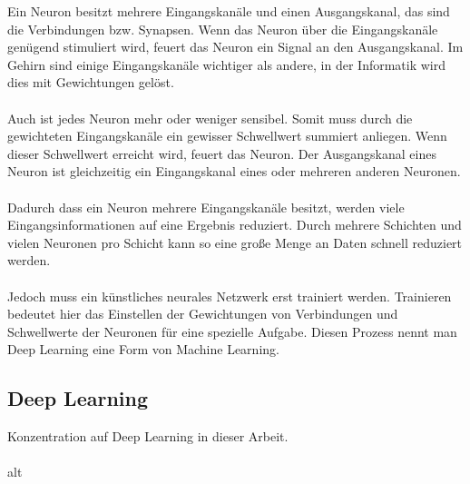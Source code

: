 \documentclass[12pt,oneside,a4paper,parskip]{scrbook}
\begin{document}
Ein Neuron besitzt mehrere Eingangskanäle 
und einen Ausgangskanal, das sind die Verbindungen bzw. Synapsen. Wenn das Neuron über die Eingangskanäle genügend stimuliert wird,
feuert das Neuron ein Signal 
an den Ausgangskanal. Im Gehirn sind einige Eingangskanäle wichtiger als andere, in der Informatik wird dies mit Gewichtungen gelöst. 
\\\\
Auch ist jedes Neuron mehr oder weniger sensibel. Somit muss durch die gewichteten Eingangskanäle 
ein gewisser Schwellwert summiert anliegen.
Wenn dieser Schwellwert 
erreicht wird, feuert das Neuron.
Der Ausgangskanal eines Neuron ist gleichzeitig ein Eingangskanal eines oder mehreren anderen Neuronen.
\\\\
Dadurch dass ein Neuron mehrere Eingangskanäle besitzt, werden viele Eingangsinformationen auf eine Ergebnis reduziert. Durch mehrere Schichten und vielen Neuronen pro Schicht kann so eine große Menge an Daten schnell reduziert werden. 
\\\\
Jedoch muss ein künstliches neurales Netzwerk erst trainiert werden. Trainieren bedeutet hier das Einstellen der Gewichtungen von Verbindungen und Schwellwerte der Neuronen für eine spezielle Aufgabe. Diesen Prozess nennt man Deep Learning eine Form von Machine Learning.
\subsection{Deep Learning}
Konzentration auf Deep Learning in dieser Arbeit.
\\\\
alt
\\\\
\end{document}
